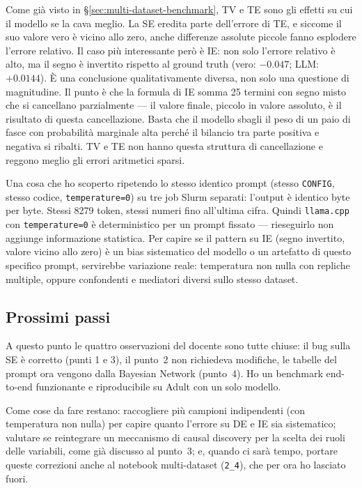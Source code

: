 Come già visto in \S\ref{sec:multi-dataset-benchmark}, TV e TE sono gli effetti su cui il modello se la cava meglio. La SE eredita parte dell'errore di TE, e siccome il suo valore vero è vicino allo zero, anche differenze assolute piccole fanno esplodere l'errore relativo. Il caso più interessante però è IE: non solo l'errore relativo è alto, ma il segno è invertito rispetto al ground truth (vero: $-0.047$; LLM: $+0.0144$). È una conclusione qualitativamente diversa, non solo una questione di magnitudine. Il punto è che la formula di IE somma 25 termini con segno misto che si cancellano parzialmente --- il valore finale, piccolo in valore assoluto, è il risultato di questa cancellazione. Basta che il modello sbagli il peso di un paio di fasce con probabilità marginale alta perché il bilancio tra parte positiva e negativa si ribalti. TV e TE non hanno questa struttura di cancellazione e reggono meglio gli errori aritmetici sparsi.

Una cosa che ho scoperto ripetendo lo stesso identico prompt (stesso \texttt{CONFIG}, stesso codice, \texttt{temperature=0}) su tre job Slurm separati: l'output è identico byte per byte. Stessi 8279 token, stessi numeri fino all'ultima cifra. Quindi \texttt{llama.cpp} con \texttt{temperature=0} è deterministico per un prompt fissato --- rieseguirlo non aggiunge informazione statistica. Per capire se il pattern su IE (segno invertito, valore vicino allo zero) è un bias sistematico del modello o un artefatto di questo specifico prompt, servirebbe variazione reale: temperatura non nulla con repliche multiple, oppure confondenti e mediatori diversi sullo stesso dataset.

\subsection*{Prossimi passi}

A questo punto le quattro osservazioni del docente sono tutte chiuse: il bug sulla SE è corretto (punti 1 e 3), il punto~2 non richiedeva modifiche, le tabelle del prompt ora vengono dalla Bayesian Network (punto~4). Ho un benchmark end-to-end funzionante e riproducibile su Adult con un solo modello.

Come cose da fare restano: raccogliere più campioni indipendenti (con temperatura non nulla) per capire quanto l'errore su DE e IE sia sistematico; valutare se reintegrare un meccanismo di causal discovery per la scelta dei ruoli delle variabili, come già discusso al punto~3; e, quando ci sarà tempo, portare queste correzioni anche al notebook multi-dataset (\texttt{2\_4}), che per ora ho lasciato fuori.
